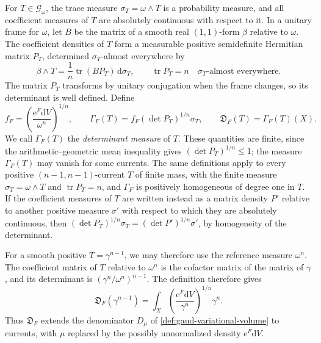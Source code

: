 For $T\in\mathscr G_\omega$, the trace measure $\sigma_T=\omega\wedge T$ is a probability measure, and all coefficient measures of $T$ are absolutely continuous with respect to it. In a unitary frame for $\omega$, let $B$ be the matrix of a smooth real $(1,1)$-form $\beta$ relative to $\omega$. The coefficient densities of $T$ form a measurable positive semidefinite Hermitian matrix $P_T$, determined $\sigma_T$-almost everywhere by
\[
 \beta\wedge T=\frac1n\operatorname{tr}(B P_T)\,\mathrm{d}\sigma_T,
 \qquad \operatorname{tr}P_T=n\quad\sigma_T\text{-almost everywhere}.
\]
The matrix $P_T$ transforms by unitary conjugation when the frame changes, so its determinant is well defined. Define
\begin{equation}\label{eq:weak-gaud-functional}
 f_F=\left(\frac{\mathrm{e}^F\mathrm{d}V}{\omega^n}\right)^{1/n},\qquad
 \Gamma_F(T)=f_F(\det P_T)^{1/n}\sigma_T,\qquad
 \mathfrak D_F(T)=\Gamma_F(T)(X).
\end{equation}
We call $\Gamma_F(T)$ the \emph{determinant measure} of $T$. These quantities are finite, since the arithmetic--geometric mean inequality gives $(\det P_T)^{1/n}\leq1$; the measure $\Gamma_F(T)$ may vanish for some currents. The same definitions apply to every positive $(n-1,n-1)$-current $T$ of finite mass, with the finite measure $\sigma_T=\omega\wedge T$ and $\operatorname{tr}P_T=n$, and $\Gamma_F$ is positively homogeneous of degree one in $T$. If the coefficient measures of $T$ are written instead as a matrix density $P'$ relative to another positive measure $\sigma'$ with respect to which they are absolutely continuous, then $(\det P_T)^{1/n}\sigma_T=(\det P')^{1/n}\sigma'$, by homogeneity of the determinant.

For a smooth positive $T=\gamma^{n-1}$, we may therefore use the reference measure $\omega^n$. The coefficient matrix of $T$ relative to $\omega^n$ is the cofactor matrix of the matrix of $\gamma$, and its determinant is $(\gamma^n/\omega^n)^{n-1}$. The definition therefore gives
\[
 \mathfrak D_F(\gamma^{n-1})
 =\int_X\left(\frac{\mathrm{e}^F\mathrm{d}V}{\gamma^n}\right)^{1/n}\gamma^n.
\]
Thus $\mathfrak D_F$ extends the denominator $D_\mu$ of \cref{def:gaud-variational-volume} to currents, with $\mu$ replaced by the possibly unnormalized density $\mathrm{e}^F\mathrm{d}V$.

